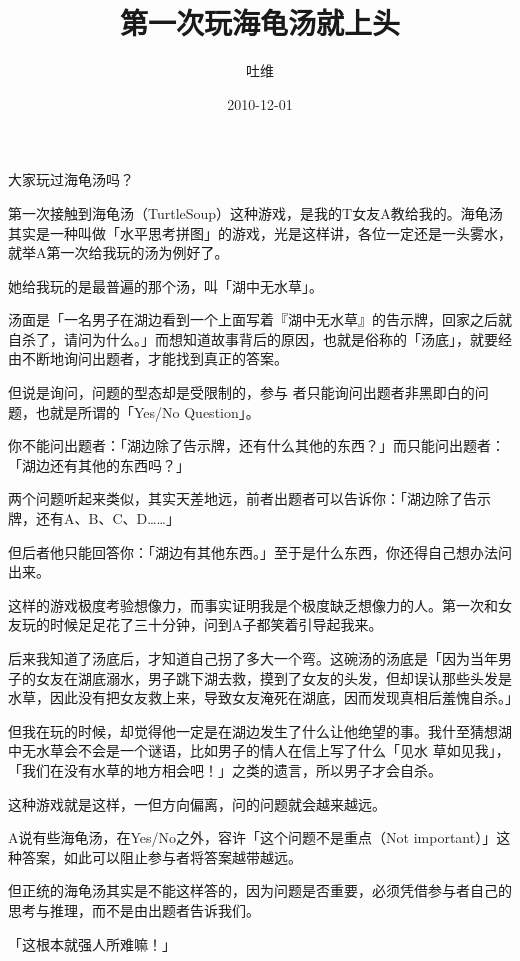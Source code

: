 \documentclass{article}
\title{第一次玩海龟汤就上头}
\author{吐维}
\date{2010-12-01}
\begin{document}

\maketitle


\Large

﻿大家玩过海龟汤吗？ 


第一次接触到海龟汤（TurtleSoup）这种游戏，是我的T女友A教给我的。海龟汤其实是一种叫做「水平思考拼图」的游戏，光是这样讲，各位一定还是一头雾水，就举A第一次给我玩的汤为例好了。 

她给我玩的是最普遍的那个汤，叫「湖中无水草」。 

汤面是「一名男子在湖边看到一个上面写着『湖中无水草』的告示牌，回家之后就自杀了，请问为什么。」而想知道故事背后的原因，也就是俗称的「汤底」，就要经由不断地询问出题者，才能找到真正的答案。 

但说是询问，问题的型态却是受限制的，参与
\newpage
者只能询问出题者非黑即白的问题，也就是所谓的「Yes/No Question」。 

你不能问出题者：「湖边除了告示牌，还有什么其他的东西？」而只能问出题者：「湖边还有其他的东西吗？」 

两个问题听起来类似，其实天差地远，前者出题者可以告诉你：「湖边除了告示牌，还有A、B、C、D……」 

但后者他只能回答你：「湖边有其他东西。」至于是什么东西，你还得自己想办法问出来。 

这样的游戏极度考验想像力，而事实证明我是个极度缺乏想像力的人。第一次和女友玩的时候足足花了三十分钟，问到A子都笑着引导起我来。 

后来我知道了汤底后，才知道自己拐了多大一个弯。这碗汤的汤底是「因为当年男子的女友在湖底溺水，男子跳下湖去救，摸到了女友的头发，但却误认那些头发是水草，因此没有把女友救上来，导致女友淹死在湖底，因而发现真相后羞愧自杀。」 

但我在玩的时候，却觉得他一定是在湖边发生了什么让他绝望的事。我什至猜想湖中无水草会不会是一个谜语，比如男子的情人在信上写了什么「见水
\newpage
草如见我」，「我们在没有水草的地方相会吧！」之类的遗言，所以男子才会自杀。 

这种游戏就是这样，一但方向偏离，问的问题就会越来越远。 

A说有些海龟汤，在Yes/No之外，容许「这个问题不是重点（Not important）」这种答案，如此可以阻止参与者将答案越带越远。 

但正统的海龟汤其实是不能这样答的，因为问题是否重要，必须凭借参与者自己的思考与推理，而不是由出题者告诉我们。 

「这根本就强人所难嘛！」 
\end{document}
